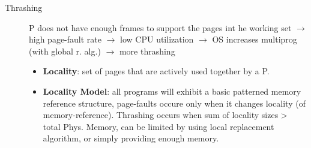 \begin{description}
    \item[Thrashing] P does not have enough frames to support the pages int he working set $\rightarrow$ high page-fault rate $\rightarrow$ low CPU utilization $\rightarrow$ OS increases multiprog (with global r. alg.) $\rightarrow$ more thrashing
    \begin{itemize}
        \item \textbf{Locality}: set of pages that are actively used together by a P.
        \item \textbf{Locality Model}: all programs will exhibit a basic patterned memory reference structure, page-faults occure only when it changes locality (of memory-reference). Thrashing occurs when sum of locality sizes > total Phys. Memory, can be limited by using local replacement algorithm, or simply providing enough memory.
    \end{itemize} %
\end{description}
